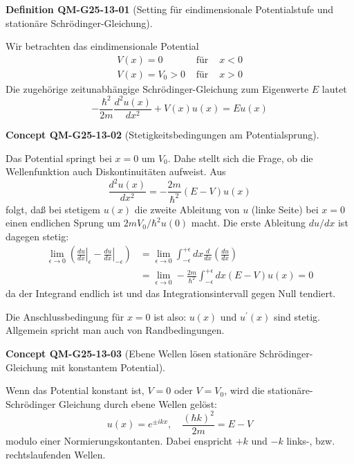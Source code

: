 \documentclass[10pt, letterpaper]{article}
\newcommand{\CustomHeading}[3]{%
  \par\medskip\noindent%
  \textbf{#1 #2} \textnormal{(#3)}.\enskip%
}
\newenvironment{DEF}[2]{\CustomHeading{Definition}{#1}{#2}}{}
\newenvironment{CONC}[2]{\CustomHeading{Concept}{#1}{#2}}{}
\begin{document}
\begin{DEF}{QM-G25-13-01}{Setting für eindimensionale Potentialstufe und stationäre Schrödinger-Gleichung}
Wir betrachten das eindimensionale Potential
$$
\begin{array}{rlll}
V(x)=0 & \text { für } & x<0 \\
V(x)=V_{0}>0 & \text { für } & x>0
\end{array}
$$
Die zugehörige zeitunabhängige Schrödinger-Gleichung zum Eigenwerte $E$ lautet
$$
-\frac{\hbar^{2}}{2 m} \frac{d^{2} u(x)}{d x^{2}}+V(x) u(x)=E u(x)
$$
\end{DEF}

\begin{CONC}{QM-G25-13-02}{Stetigkeitsbedingungen am Potentialsprung}
Das Potential springt bei $x=0$ um $V_{0}$. Dahe stellt sich die Frage, ob die Wellenfunktion auch Diskontinuitäten aufweist. Aus
$$
\frac{d^{2} u(x)}{d x^{2}}=-\frac{2 m}{\hbar^{2}}(E-V) u(x)
$$
folgt, daß bei stetigem $u(x)$ die zweite Ableitung von $u$ (linke Seite) bei $x=0$ einen endlichen Sprung um $2 m V_{0} / \hbar^{2} u(0)$ macht.
Die erste Ableitung $d u / d x$ ist dagegen stetig:
$$
\begin{aligned}
\lim _{\epsilon \rightarrow 0}\left(\left.\frac{d u}{d x}\right|_{\epsilon}-\left.\frac{d u}{d x}\right|_{-\epsilon}\right) & =\lim _{\epsilon \rightarrow 0} \int_{-\epsilon}^{+\epsilon} d x \frac{d}{d x}\left(\frac{d u}{d x}\right) \\
& =\lim _{\epsilon \rightarrow 0}-\frac{2 m}{\hbar^{2}} \int_{-\epsilon}^{+\epsilon} d x(E-V) u(x)=0
\end{aligned}
$$
da der Integrand endlich ist und das Integrationsintervall gegen Null tendiert.

Die Anschlussbedingung für $x=0$ ist also: $u(x)$ und $u^{\prime}(x)$ sind stetig. Allgemein spricht man auch von Randbedingungen.
\end{CONC}

\begin{CONC}{QM-G25-13-03}{Ebene Wellen lösen stationäre Schrödinger-Gleichung mit konstantem Potential}
Wenn das Potential konstant ist, $V=0$ oder $V=V_{0}$, wird die stationäre-Schrödinger Gleichung durch ebene Wellen gelöst:
$$
u(x)=e^{ \pm i k x}, \quad \frac{(\hbar k)^{2}}{2 m}=E-V
$$
modulo einer Normierungskontanten. Dabei enspricht $+k$ und $-k$ links-, bzw. rechtslaufenden Wellen.
\end{CONC}
\end{document}
